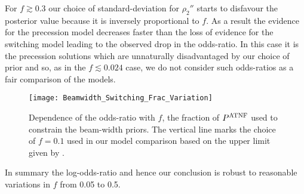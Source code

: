 \documentclass[../full_thesis/full_thesis.tex]{subfiles}
\begin{document}
For $f \gtrsim 0.3$ our choice of standard-deviation for $\rho_2''$ starts to
disfavour the posterior value because it is inversely proportional to $f$. As
a result the evidence for the precession model decreases faster than the loss of
evidence for the switching model leading to the observed drop in the odds-ratio.
In this case it is the precession solutions which are unnaturally disadvantaged
by our choice of prior and so, as in the $f\lesssim 0.024$ case, we do not consider
such odds-ratios as a fair comparison of the models.

\begin{figure}
\centering
\texttt{[image: Beamwidth\_Switching\_Frac\_Variation]}
\caption{Dependence of the
         odds-ratio with $f$, the fraction of $P^{\mathrm{ATNF}}$ used to constrain the
         beam-width priors. The vertical line
         marks the choice of $f=0.1$ used in our model comparison based on the
         upper limit given by \citet{Lyne1988}.}
\label{fig: beamwidth switching frac variation}
\end{figure}

In summary the log-odds-ratio and hence our conclusion is robust to reasonable
variations in $f$ from 0.05 to 0.5.
\end{document}
